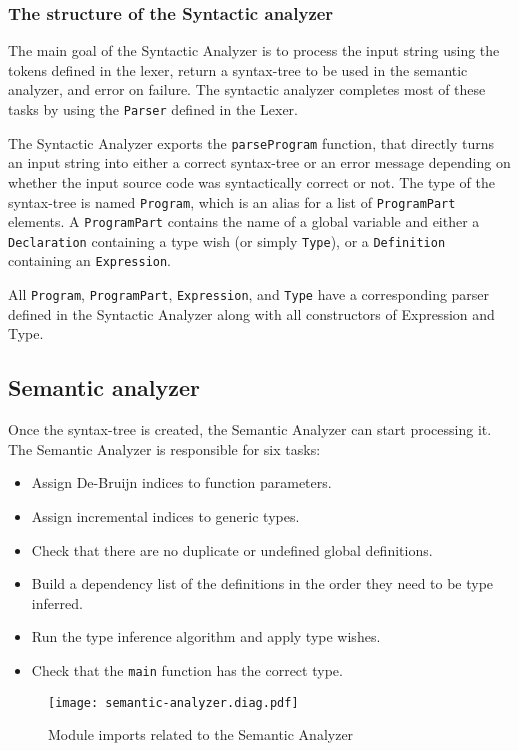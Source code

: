 \documentclass[12pt]{article}
\begin{document}
\subsubsection{The structure of the Syntactic analyzer}

The main goal of the Syntactic Analyzer is to process the input string using the
tokens defined in the lexer, return a syntax-tree to be used in the semantic
analyzer, and error on failure. The syntactic analyzer completes most of these
tasks by using the \verb$Parser$ defined in the Lexer.

The Syntactic Analyzer exports the \verb$parseProgram$ function, that directly
turns an input string into either a correct syntax-tree or an error message
depending on whether the input source code was syntactically correct or not. The
type of the syntax-tree is named \verb$Program$, which is an alias for a list of
\verb$ProgramPart$ elements. A \verb$ProgramPart$ contains the name of a global
variable and either a \verb$Declaration$ containing a type wish (or simply
\verb$Type$), or a \verb$Definition$ containing an \verb$Expression$.

All \verb$Program$, \verb$ProgramPart$, \verb$Expression$, and \verb$Type$ have
a corresponding parser defined in the Syntactic Analyzer along with all
constructors of Expression and Type.

\subsection{Semantic analyzer}

Once the syntax-tree is created, the Semantic Analyzer can start processing it.
The Semantic Analyzer is responsible for six tasks:
\begin{itemize}
    \item Assign De-Bruijn indices to function parameters.
    \item Assign incremental indices to generic types.
    \item Check that there are no duplicate or undefined global definitions.
    \item Build a dependency list of the definitions in the order they need to
        be type inferred.
    \item Run the type inference algorithm and apply type wishes.
    \item Check that the \verb$main$ function has the correct type.
\end{itemize}

\begin{figure}[t]
\texttt{[image: semantic-analyzer.diag.pdf]}
\centering
\caption{Module imports related to the Semantic Analyzer}
\end{figure}
\end{document}
